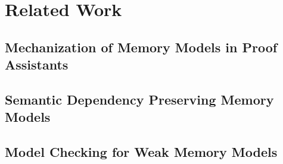 \chapter{Related Work}
\label{ch:related-work}

\section{Mechanization of Memory Models in Proof Assistants}

\section{Semantic Dependency Preserving Memory Models}

\section{Model Checking for Weak Memory Models}

